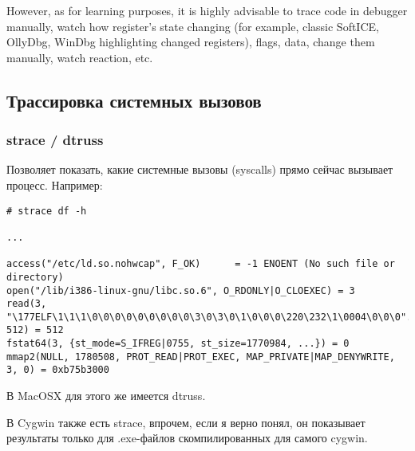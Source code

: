 {However, as for learning purposes, it is highly advisable to trace code in debugger manually, watch how register's state
changing (for example, classic SoftICE, OllyDbg, WinDbg highlighting changed registers), flags, data, change them
manually, watch reaction, etc.}

\subsection{Трассировка системных вызовов}

\label{strace}
\subsubsection{strace / dtruss}

Позволяет показать, какие системные вызовы (syscalls) прямо сейчас вызывает процесс. Например:

\begin{lstlisting}
# strace df -h

...

access("/etc/ld.so.nohwcap", F_OK)      = -1 ENOENT (No such file or directory)
open("/lib/i386-linux-gnu/libc.so.6", O_RDONLY|O_CLOEXEC) = 3
read(3, "\177ELF\1\1\1\0\0\0\0\0\0\0\0\0\3\0\3\0\1\0\0\0\220\232\1\0004\0\0\0"..., 512) = 512
fstat64(3, {st_mode=S_IFREG|0755, st_size=1770984, ...}) = 0
mmap2(NULL, 1780508, PROT_READ|PROT_EXEC, MAP_PRIVATE|MAP_DENYWRITE, 3, 0) = 0xb75b3000
\end{lstlisting}

В MacOSX для этого же имеется dtruss.

В Cygwin также есть strace, впрочем, если я верно понял, 
он показывает результаты только для .exe-файлов скомпилированных для самого cygwin.

